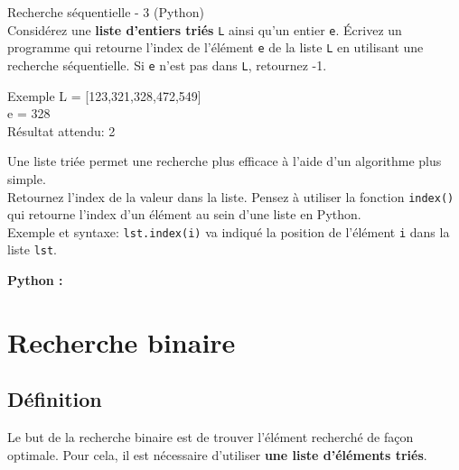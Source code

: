     
    \begin{Exercice}[10 minutes] Recherche séquentielle - 3 (Python)\\
    Considérez une \textbf{liste d’entiers triés} \lstinline{L} ainsi qu’un entier \lstinline{e}. Écrivez un programme qui retourne l'index de l'élément \lstinline{e} de la liste \lstinline{L} en utilisant une recherche séquentielle. Si \lstinline{e} n’est pas dans \lstinline{L}, retournez -1.\\
    
    \begin{Example}{\faTerminal Exemple}
        L = [123,321,328,472,549] \\
        e = 328 \\
        Résultat attendu: 2\\
    \end{Example}
  


    \begin{conseil}
        Une liste triée permet une recherche plus efficace à l'aide d'un algorithme plus simple.\\
        Retournez l'index de la valeur dans la liste. Pensez à utiliser la fonction \lstinline{index()} qui retourne l'index d'un élément au sein d'une liste en Python.\\Exemple et syntaxe: \lstinline{lst.index(i)} va indiqué la position de l'élément \lstinline{i} dans la liste \lstinline{lst}.
    \end{conseil}


    \begin{solution}
        \textbf{Python :}
        
    \end{solution}
\end{Exercice}
    
    
    \newpage
    \section{Recherche binaire}
    
    \subsection{Définition}
    
    Le but de la recherche binaire est de trouver l'élément recherché de façon optimale. Pour cela, il est nécessaire d'utiliser \textbf{une liste d'éléments triés}.\\
    
